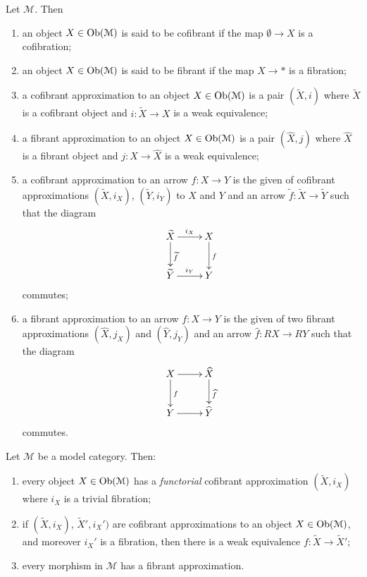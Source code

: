 \begin{refsection}
\begin{defin}
Let $\mathcal M$. Then
\begin{enumerate}
\item an object $X \in \operatorname{Ob}(\mathcal M)$ is said to be cofibrant if the map $\emptyset \to X$ is a cofibration;
\item an object $X \in \operatorname{Ob}(\mathcal M)$ is said to be fibrant if the map $X \to *$ is a fibration;
\item a cofibrant approximation to an object $X \in \operatorname{Ob}(\mathcal M)$ is a pair $(\widetilde{X},i)$ where $\widetilde{X}$ is a cofibrant object and $i \colon \widetilde{X} \to X$ is a weak equivalence;
\item a fibrant approximation to an object $X \in \operatorname{Ob}(\mathcal M)$ is a pair $(\widehat{X},j)$ where $\widehat{X}$ is a fibrant object and $j \colon X \to \widehat{X}$ is a weak equivalence;
\item a cofibrant approximation to an arrow $f \colon X \to Y$ is the given of cofibrant approximations $(\widetilde{X},i_X)$, $(\widetilde{Y},i_Y)$ to $X$ and $Y$ and an arrow $\widetilde{f} \colon \widetilde{X} \to \widetilde{Y}$ such that the diagram
\[
\xymatrix{ \widetilde{X} \ar[r]^{i_X} \ar[d]^{\widetilde{f}} & X \ar[d]^f \\ \widetilde{Y} \ar[r]^{i_Y} & Y }
\]
commutes;
\item a fibrant approximation to an arrow $f \colon X \to Y$ is the given of two fibrant approximations $(\widehat{X},j_X)$ and $(\widehat{Y},j_Y)$ and an arrow $\widehat{f} \colon RX \to RY$ such that the diagram
\[
\xymatrix{ X \ar[r] \ar[d]^f & \widehat{X} \ar[d]^{\widehat{f}} \\ Y \ar[r] & \widehat{Y} }
\]
commutes.
\end{enumerate}
\end{defin}

\begin{prop} \label{prop approximations}
Let $\mathcal M$ be a model category. Then:
\begin{enumerate}
\item every object $X \in \operatorname{Ob}(\mathcal M)$ has a \emph{functorial} cofibrant approximation $(\widetilde{X},i_X)$ where $i_X$ is a trivial fibration;
\item if $(\widetilde{X},i_X)$, $\widetilde{X}',i_X')$ are cofibrant approximations to an object $X \in \operatorname{Ob}(\mathcal M)$, and moreover $i_X'$ is a fibration, then there is a weak equivalence $f \colon \widetilde{X} \to \widetilde{X}'$;
\item every morphism in $\mathcal M$ has a fibrant approximation.
\end{enumerate}
\end{prop}


\end{refsection}
